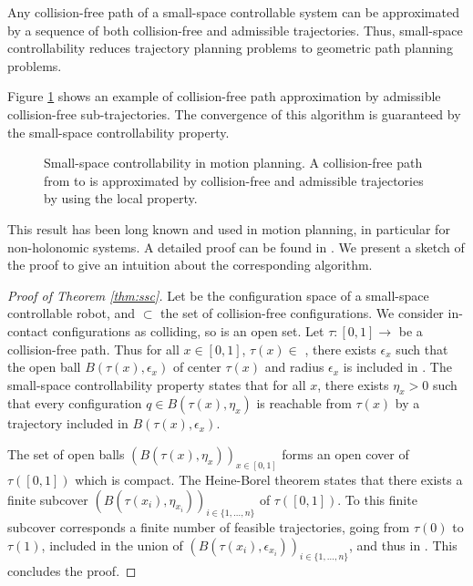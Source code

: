\begin{theorem}
  \label{thm:ssc}
  Any collision-free path of a small-space controllable system can be approximated
  by a sequence of both collision-free and admissible trajectories. Thus, small-space 
  controllability reduces trajectory planning problems to geometric path planning problems.
\end{theorem}

Figure \ref{fig:ssc2} shows an example of collision-free path
approximation by admissible collision-free sub-trajectories. The
convergence of this algorithm is guaranteed by the small-space
controllability property.

\begin{figure}
  \centering

  

  \caption{Small-space controllability in motion planning. 
    A collision-free path from
     to  is approximated by collision-free and admissible
    trajectories by using the local property.
  }
  \label{fig:ssc2}
\end{figure}

This result has been long known and used in motion planning, in
particular for non-holonomic systems. A detailed proof can be found in
\cite{taix-94}. We present a sketch of the proof to give an intuition
about the corresponding algorithm.

\begin{proof}[Proof of Theorem \ref{thm:ssc}]
  Let \cspace\enspace be the configuration space of a small-space
  controllable robot, and \cfree\thinspace $\subset$ \cspace\thinspace
  the set of collision-free configurations. We consider in-contact
  configurations as colliding, so \cfree\thinspace is an open set.
  Let $\tau : [0,1] \rightarrow $ \cfree\thinspace be a collision-free
  path. Thus for all $x \in [0,1]$, $\tau(x) \in $ \cfree\thinspace,
  there exists $\epsilon_x$ such that the open ball
  $B(\tau(x),\epsilon_x)$ of center $\tau(x)$ and radius $\epsilon_x$
  is included in \cfree. The small-space controllability property
  states that for all $x$, there exists $\eta_x > 0$ such that every
  configuration $q \in B(\tau(x),\eta_x)$ is reachable from $\tau(x)$
  by a trajectory included in $B(\tau(x),\epsilon_x)$.

  The set of open balls $\left( B(\tau(x),\eta_x) \right)_{x\in
    [0,1]}$ forms an open cover of $\tau([0,1])$ which is compact. The
  Heine-Borel theorem \cite{fitzpatrick2006advanced} states that there
  exists a finite subcover $\left( B(\tau(x_i),\eta_{x_i})
  \right)_{i\in \{ 1,\dots ,n \}}$ of $\tau([0,1])$. To this finite
  subcover corresponds a finite number of feasible trajectories, going
  from $\tau(0)$ to $\tau(1)$, included in the union of $\left(
  B(\tau(x_i),\epsilon_{x_i}) \right)_{i\in \{ 1,\dots ,n \}}$, and
  thus in \cfree. This concludes the proof.
\end{proof}

